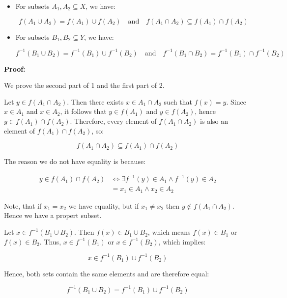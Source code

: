 \begin{itemize}

	\item For subsets \( A_1, A_2 \subseteq X \), we have:

	      \[
		      f(A_1 \cup A_2) = f(A_1) \cup f(A_2)
		      \quad \text{and} \quad
		      f(A_1 \cap A_2) \subseteq f(A_1) \cap f(A_2)
	      \]

	\item For subsets \( B_1, B_2 \subseteq Y \), we have:

	      \[
		      f^{-1}(B_1 \cup B_2) = f^{-1}(B_1) \cup f^{-1}(B_2)
		      \quad \text{and} \quad
		      f^{-1}(B_1 \cap B_2) = f^{-1}(B_1) \cap f^{-1}(B_2)
	      \]
\end{itemize}

\textbf{Proof:}

We prove the second part of 1 and the first part of 2.

Let \( y \in f(A_1 \cap A_2) \). Then there exists \( x \in A_1 \cap A_2 \) such that
\( f(x) = y \). Since \( x \in A_1 \) and \( x \in A_2 \), it follows that \( y \in f(A_1) \)
and \( y \in f(A_2) \), hence \( y \in f(A_1) \cap f(A_2) \). Therefore, every element of
\( f(A_1 \cap A_2) \) is also an element of \( f(A_1) \cap f(A_2) \), so:

\[
	f(A_1 \cap A_2) \subseteq f(A_1) \cap f(A_2)
\]

The reason we do not have equality is because:

\begin{align*}
	y \in f(A_1) \cap f(A_2) & \iff \exists f^{-1}(y) \in A_1 \land f^{-1}(y) \in A_2 \\
	                         & = x_1 \in A_1 \land x_2 \in A_2
\end{align*}

Note, that if \(x_1 = x_2\) we have equality, but if \(x_1 \neq x_2\) then \(y \notin f(A_1 \cap A_2)\). Hence
we have a propert subset.

\QED

Let \( x \in f^{-1} (B_1 \cup B_2) \). Then \( f(x) \in B_1 \cup B_2 \), which means \( f(x) \in B_1 \)
or \( f(x) \in B_2 \). Thus, \( x \in f^{-1}(B_1) \)
or \( x \in f^{-1}(B_2) \), which implies:

\[
	x \in f^{-1}(B_1) \cup f^{-1}(B_2)
\]

Hence, both sets contain the same elements and are therefore equal:

\[
	f^{-1}(B_1 \cup B_2) = f^{-1}(B_1) \cup f^{-1}(B_2)
\]

